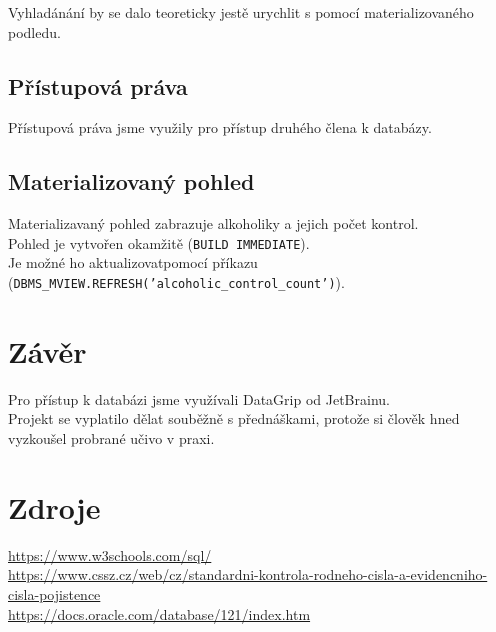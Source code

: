 \documentclass[11pt, a4paper]{article}
\begin{document}
Vyhladánání by se dalo teoreticky jestě urychlit s pomocí materializovaného podledu.

\subsection{Přístupová práva}
Přístupová práva jsme využily pro přístup druhého člena k databázy.

\subsection{Materializovaný pohled}
Materializavaný pohled zabrazuje alkoholiky a jejich počet kontrol.\\
Pohled je vytvořen okamžitě (\texttt{BUILD IMMEDIATE}). \\
Je možné ho aktualizovatpomocí příkazu
(\texttt{DBMS\_MVIEW.REFRESH('alcoholic\_control\_count')}).

\section{Závěr}
Pro přístup k databázi jsme využívali DataGrip od JetBrainu.\\
Projekt se vyplatilo dělat souběžně s přednáškami, protože si člověk hned vyzkoušel probrané učivo v praxi.\\

\section{Zdroje}

\url{https://www.w3schools.com/sql/}\\
\url{https://www.cssz.cz/web/cz/standardni-kontrola-rodneho-cisla-a-evidencniho-cisla-pojistence}\\
\url{https://docs.oracle.com/database/121/index.htm}\\
\end{document}
